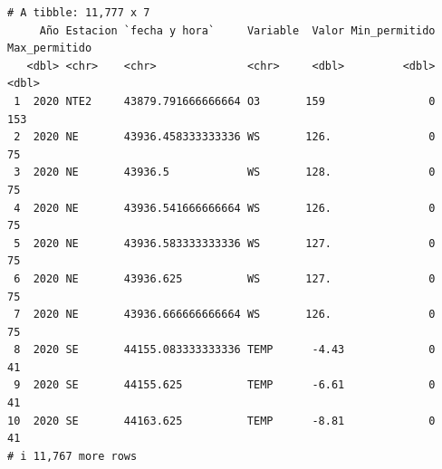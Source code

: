 \documentclass[
  letterpaper,
  DIV=11,
  numbers=noendperiod]{scrartcl}
\begin{document}
\begin{verbatim}
# A tibble: 11,777 x 7
     Año Estacion `fecha y hora`     Variable  Valor Min_permitido Max_permitido
   <dbl> <chr>    <chr>              <chr>     <dbl>         <dbl>         <dbl>
 1  2020 NTE2     43879.791666666664 O3       159                0           153
 2  2020 NE       43936.458333333336 WS       126.               0            75
 3  2020 NE       43936.5            WS       128.               0            75
 4  2020 NE       43936.541666666664 WS       126.               0            75
 5  2020 NE       43936.583333333336 WS       127.               0            75
 6  2020 NE       43936.625          WS       127.               0            75
 7  2020 NE       43936.666666666664 WS       126.               0            75
 8  2020 SE       44155.083333333336 TEMP      -4.43             0            41
 9  2020 SE       44155.625          TEMP      -6.61             0            41
10  2020 SE       44163.625          TEMP      -8.81             0            41
# i 11,767 more rows
\end{verbatim}
\end{document}
